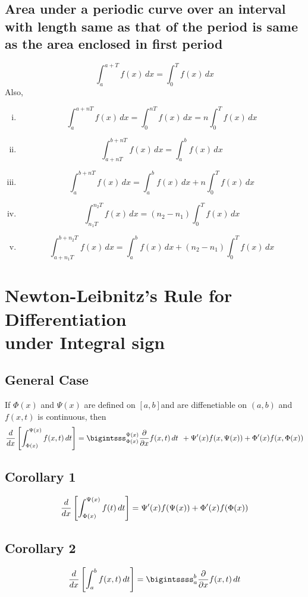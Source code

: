 \documentclass{article}
\begin{document}
\subsection{Area under a periodic curve over an interval with length same as that of the period is same as the area enclosed in first period}
$$\displaystyle\int_{a}^{a+T} f(x) \, dx=\displaystyle\int_{0}^{T}f(x)  \, dx  $$
Also, \begin{enumerate}[i.]
    \item $$\displaystyle\int_{a}^{a+nT} f(x) \, dx=\displaystyle\int_{0}^{nT} f(x) \, dx =n\displaystyle\int_{0}^{T} f(x) \, dx $$
    \item $$\displaystyle\int_{a+nT}^{b+nT} f(x) \, dx= \displaystyle\int_{a}^{b} f(x) \, dx $$
    \item $$\displaystyle\int_{a}^{b+nT} f(x) \, dx =\displaystyle\int_{a}^{b} f(x) \, dx + n \displaystyle\int_{0}^{T} f(x) \, dx $$
    \item $$\displaystyle\int_{n_{1}T}^{n_{2}T} f(x) \, dx =(n_{2}-n_{1})\displaystyle\int_{0}^{T} f(x)  \, dx $$
    \item $$\displaystyle\int_{a+n_{1}T}^{b+n_{2}T} f(x)  \, dx =\displaystyle\int_{a}^{b} f(x) \, dx +(n_{2}-n_{1})\displaystyle\int_{0}^{T} f(x) \, dx $$
\end{enumerate}
\section{Newton-Leibnitz's Rule for Differentiation \\under Integral sign}
\subsection{General Case}
If $\Phi (x) $ and $\Psi (x)$ are defined on $[a,b]$and are diffenetiable on $(a,b)$ and $f(x,t)$ is continuous, then
$$\dv{x}\left[\displaystyle\int_{\Phi (x)}^{\Psi (x)} f(x,t) \, dt \right]=\displaystyle\bigintsss_{\Phi (x)}^{\Psi (x)} \pdv{x}f(x,t) \, dt \hspace{1.5mm}+\Psi'(x)f(x,\Psi(x))+\Phi'(x)f(x,\Phi(x)) $$

\subsection*{Corollary 1}
$$\dv{x}\left[\displaystyle\int_{\Phi (x)}^{\Psi (x)} f(t) \, dt \right]=\Psi'(x)f(\Psi(x))+\Phi'(x)f(\Phi(x)) $$
\subsection*{Corollary 2}
$$\dv{x}\left[\displaystyle\int_{a}^{b} f(x,t) \, dt \right]=\displaystyle\bigintssss_{a}^{b} \pdv{x}f(x,t) \, dt $$
\end{document}
